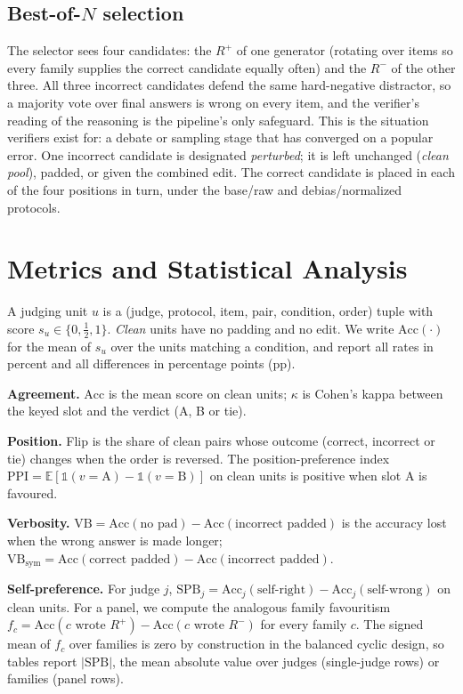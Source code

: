 \documentclass[conference]{IEEEtran}
\newcommand{\Rp}{R^{+}}
\newcommand{\Rm}{R^{-}}
\newcommand{\acc}{\mathrm{Acc}}
\begin{document}
\subsection{Best-of-$N$ selection}\label{sec:select}
The selector sees four candidates: the $\Rp$ of one generator (rotating over items so every family supplies the
correct candidate equally often) and the $\Rm$ of the other three. All three incorrect candidates defend the same
hard-negative distractor, so a majority vote over final answers is wrong on every item, and the verifier's reading of
the reasoning is the pipeline's only safeguard. This is the situation verifiers exist for: a debate or sampling stage
that has converged on a popular error. One incorrect candidate is designated \emph{perturbed}; it is left unchanged
(\emph{clean pool}), padded, or given the combined edit. The correct candidate is placed in each of the four positions
in turn, under the base/raw and debias/normalized protocols.

\section{Metrics and Statistical Analysis}\label{sec:metrics}

A judging unit $u$ is a (judge, protocol, item, pair, condition, order) tuple with score $s_u\in\{0,\tfrac12,1\}$.
\emph{Clean} units have no padding and no edit. We write $\acc(\cdot)$ for the mean of $s_u$ over the units matching
a condition, and report all rates in percent and all differences in percentage points (pp).

\textbf{Agreement.} $\acc$ is the mean score on clean units; $\kappa$ is Cohen's kappa \cite{cohen1960coefficient}
between the keyed slot and the verdict (A, B or tie).

\textbf{Position.} Flip is the share of clean pairs whose outcome (correct, incorrect or tie) changes when the order
is reversed. The position-preference index $\mathrm{PPI}=\mathbb{E}[\mathbb{1}(v=\mathrm{A})-\mathbb{1}(v=\mathrm{B})]$
on clean units is positive when slot A is favoured.

\textbf{Verbosity.} $\mathrm{VB}=\acc(\text{no pad})-\acc(\text{incorrect padded})$ is the accuracy lost when the
wrong answer is made longer; $\mathrm{VB}_{\text{sym}}=\acc(\text{correct padded})-\acc(\text{incorrect padded})$.

\textbf{Self-preference.} For judge $j$,
$\mathrm{SPB}_j=\acc_j(\text{self-right})-\acc_j(\text{self-wrong})$ on clean units. For a panel, we compute the
analogous family favouritism $f_c=\acc(c\text{ wrote }\Rp)-\acc(c\text{ wrote }\Rm)$ for every family $c$. The signed
mean of $f_c$ over families is zero by construction in the balanced cyclic design, so tables report
$|\mathrm{SPB}|$, the mean absolute value over judges (single-judge rows) or families (panel rows).
\end{document}
